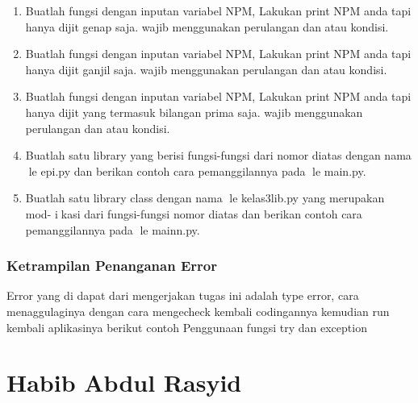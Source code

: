 \begin{enumerate}
    \item Buatlah fungsi dengan inputan variabel NPM, Lakukan print NPM anda tapi
    hanya dijit genap saja. wajib menggunakan perulangan dan atau kondisi.
    

    \item Buatlah fungsi dengan inputan variabel NPM, Lakukan print NPM anda tapi
    hanya dijit ganjil saja. wajib menggunakan perulangan dan atau kondisi.
    

    \item Buatlah fungsi dengan inputan variabel NPM, Lakukan print NPM anda tapi
    hanya dijit yang termasuk bilangan prima saja. wajib menggunakan perulangan
    dan atau kondisi.
    

    \item Buatlah satu library yang berisi fungsi-fungsi dari nomor diatas dengan nama
    le epi.py dan berikan contoh cara pemanggilannya pada le main.py.
    

    \item Buatlah satu library class dengan nama le kelas3lib.py yang merupakan mod-
    ikasi dari fungsi-fungsi nomor diatas dan berikan contoh cara pemanggilannya
    pada le mainn.py.
    

\end{enumerate}
\subsubsection{Ketrampilan Penanganan Error}
Error yang di dapat dari mengerjakan tugas ini adalah type error, cara menaggulaginya dengan cara mengecheck kembali codingannya
kemudian run kembali aplikasinya
berikut contoh Penggunaan fungsi try dan exception


\section{Habib Abdul Rasyid}
